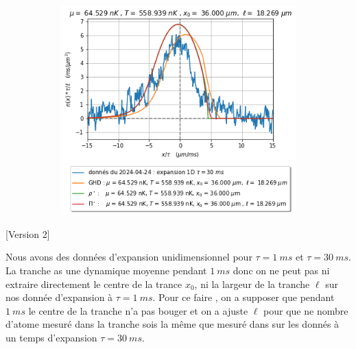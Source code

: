 \documentclass[a3, 10pt,twoside]{article}          %
\theoremstyle{plain}
\theoremstyle{definition}
\theoremstyle{remark}
\theoremstyle{definition} %
\begin{document}
\begin{figure}[H]
\begin{subfigure}[b]{0.32\textwidth}
        \caption{}
        \label{fig:expansion_1_expansion}
    \end{subfigure}
    \hfill
    \begin{subfigure}[b]{0.32\textwidth}
        \centering
        \includegraphics[width=\textwidth]{Figures/simul_expansion_30_expansion_36}
        \caption{}
        \label{}
    \end{subfigure}
    
    
    
    \caption{}
    


    
    \label{}
\end{figure}
	
	
	[Version 2]
	
	
	Nous avons des données d'expansion unidimensionnel pour $\tau = 1~ms$ et $\tau = 30~ms$. La tranche as une dynamique moyenne pendant $1~ms$ donc on ne peut pas ni extraire directement le centre de la trance $x_0$, ni la largeur de la tranche $\ell$ sur nos donnée d'expansion à $\tau = 1~ms$. Pour ce faire , on a supposer que pendant $1~ms$ le centre de la tranche n'a pas bouger et on a ajuste $\ell$ pour que ne nombre d'atome mesuré dans la tranche sois la même  que mesuré dans sur les donnés à un temps d'expansion $\tau = 30~ms$. 
	
\end{document}
